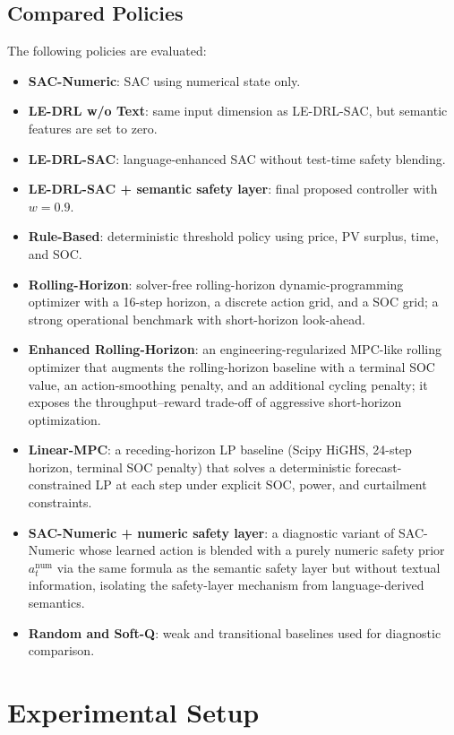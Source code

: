 \documentclass{ieeeaccess}
\begin{document}
\subsection{Compared Policies}
The following policies are evaluated:
\begin{itemize}
  \item \textbf{SAC-Numeric}: SAC using numerical state only.
  \item \textbf{LE-DRL w/o Text}: same input dimension as LE-DRL-SAC, but semantic features are set to zero.
  \item \textbf{LE-DRL-SAC}: language-enhanced SAC without test-time safety blending.
  \item \textbf{LE-DRL-SAC + semantic safety layer}: final proposed controller with $w=0.9$.
  \item \textbf{Rule-Based}: deterministic threshold policy using price, PV surplus, time, and SOC.
  \item \textbf{Rolling-Horizon}: solver-free rolling-horizon dynamic-programming optimizer with a 16-step horizon, a discrete action grid, and a SOC grid; a strong operational benchmark with short-horizon look-ahead.
  \item \textbf{Enhanced Rolling-Horizon}: an engineering-regularized MPC-like rolling optimizer that augments the rolling-horizon baseline with a terminal SOC value, an action-smoothing penalty, and an additional cycling penalty; it exposes the throughput--reward trade-off of aggressive short-horizon optimization.
  \item \textbf{Linear-MPC}: a receding-horizon LP baseline (Scipy HiGHS, 24-step horizon, terminal SOC penalty) that solves a deterministic forecast-constrained LP at each step under explicit SOC, power, and curtailment constraints.
  \item \textbf{SAC-Numeric + numeric safety layer}: a diagnostic variant of SAC-Numeric whose learned action is blended with a purely numeric safety prior $a^{\mathrm{num}}_t$ via the same formula as the semantic safety layer but without textual information, isolating the safety-layer mechanism from language-derived semantics.
  \item \textbf{Random and Soft-Q}: weak and transitional baselines used for diagnostic comparison.
\end{itemize}

\section{Experimental Setup}
\label{sec:experiment}
\end{document}
